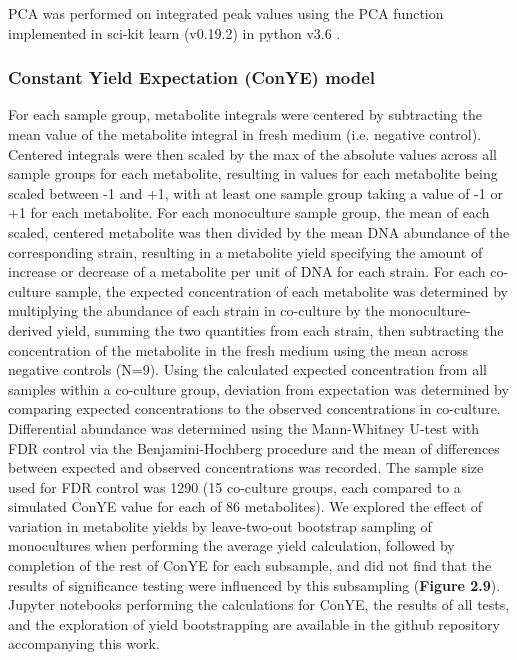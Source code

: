 \documentclass[11pt,onecolumn,notitlepage,openany,twoside]{book}
\begin{document}
\begin{refsection}
PCA was performed on integrated peak values using the PCA function implemented in sci-kit learn (v0.19.2) in python v3.6 \cite{Pedregosa2011-wa}.

\subsubsection{Constant Yield Expectation (ConYE) model}

For each sample group, metabolite integrals were centered by subtracting the mean value of the metabolite integral in fresh medium (i.e. negative control). Centered integrals were then scaled by the max of the absolute values across all sample groups for each metabolite, resulting in values for each metabolite being scaled between -1 and +1, with at least one sample group taking a value of -1 or +1 for each metabolite. For each monoculture sample group, the mean of each scaled, centered metabolite was then divided by the mean DNA abundance of the corresponding strain, resulting in a metabolite yield specifying the amount of increase or decrease of a metabolite per unit of DNA for each strain. For each co-culture sample, the expected concentration of each metabolite was determined by multiplying the abundance of each strain in co-culture by the monoculture-derived yield, summing the two quantities from each strain, then subtracting the concentration of the metabolite in the fresh medium using the mean across negative controls (N=9). Using the calculated expected concentration from all samples within a co-culture group, deviation from expectation was determined by comparing expected concentrations to the observed concentrations in co-culture. Differential abundance was determined using the Mann-Whitney U-test with FDR control via the Benjamini-Hochberg procedure \cite{Benjamini1995-nd} and the mean of differences between expected and observed concentrations was recorded. The sample size used for FDR control was 1290 (15 co-culture groups, each compared to a simulated ConYE value for each of 86 metabolites). We explored the effect of variation in metabolite yields by leave-two-out bootstrap sampling of monocultures when performing the average yield calculation, followed by completion of the rest of ConYE for each subsample, and did not find that the results of significance testing were influenced by this subsampling (\textbf{Figure 2.9}). Jupyter notebooks performing the calculations for ConYE, the results of all tests, and the exploration of yield bootstrapping are available in the github repository accompanying this work.


\end{refsection}
\end{document}
